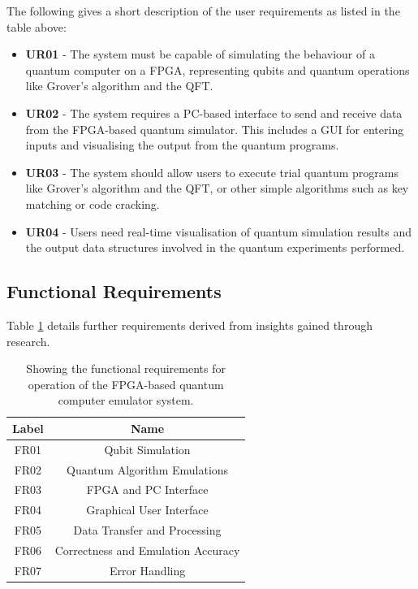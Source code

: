 The following gives a short description of the user requirements as listed in the table above:
\begin{itemize}
	\item 
	\textbf{UR01} - The system must be capable of simulating the behaviour of a quantum computer on a FPGA, representing qubits and quantum operations like Grover's algorithm and the QFT. 
	\item 
	\textbf{UR02} -  The system requires a PC-based interface to send and receive data from the FPGA-based quantum simulator. This includes a GUI for entering inputs and visualising the output from the quantum programs.
	\item 
	\textbf{UR03} - The system should allow users to execute trial quantum programs like Grover's algorithm and the QFT, or other simple algorithms such as key matching or code cracking.
	\item 
	\textbf{UR04} - Users need real-time visualisation of quantum simulation results and the output data structures involved in the quantum experiments performed. 
\end{itemize}
\subsection{Functional Requirements \label{subsec:method-functional-req}}

Table \ref{tab:frs} details further requirements derived from insights gained through research.
\begin{table}[ht!]
	\centering
	\caption[Functional System Requirements.]{Showing the functional requirements for operation of the FPGA-based quantum computer emulator system.}
	\label{tab:frs}
	\begin{tabular}{ | c | c | } 
		\hline
		\textbf{Label} & \textbf{Name} \\ 
		\hline
		FR01 & Qubit Simulation \\ 
		\hline
		FR02 & Quantum Algorithm Emulations \\ 
		\hline
		FR03 & FPGA and PC Interface \\ 
		\hline
		FR04 & Graphical User Interface \\ 
		\hline
		FR05 & Data Transfer and Processing \\ 
		\hline
		FR06 & Correctness and Emulation Accuracy \\ 
		\hline
		FR07 & Error Handling \\ 
		\hline
	\end{tabular}
\end{table}

